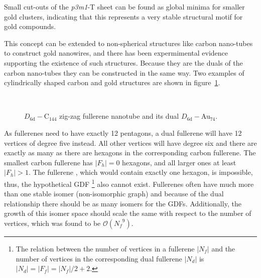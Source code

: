 Small cut-outs of the \textit{p3m1}-T sheet can be found as global minima for smaller
gold clusters, indicating that this represents a very stable structural motif
for gold compounds.\autocite{Assadollahzadeh_systematicsearchminimum_2009}

This concept can be extended to non-spherical structures like carbon nano-tubes
to construct gold nanowires, and there has been expermimental evidence
supporting the existence of such structures\autocite{Kondo-2000}. Because they
are the duals of the carbon nano-tubes they can be constructed in the same
way.\autocite{Dresselhaus-1992} Two examples of cylindrically shaped carbon and gold structures are shown in figure~\ref{fig:nanotubedual}.

\begin{figure}[htb]
    \begin{center}
         \\
        \caption{\protect{} $D_\mathrm{6d}-$C$_{144}$ zig-zag
        fullerene nanotube and \protect{} its dual
        $D_\mathrm{6d}-$Au$_{74}$.}
    \label{fig:nanotubedual}
    \end{center}
\end{figure}

As fullerenes need to have exactly 12 pentagons, a dual fullerene will have 12
vertices of degree five instead. All other vertices will have degree six and
there are exactly as many as there are hexagons in the corresponding carbon
fullerene. The smallest carbon fullerene  has $|F_h|=0$ hexagons, and
all larger ones at least $|F_h|>1$. The fullerene , which would contain
exactly one hexagon, is
impossible,\autocite{Grunbaum_numberhexagonssimplicity_1963} thus, the
hypothetical \ac{GDF} \footnote{The relation between the
number of vertices in a fullerene $|N_f|$ and the number of vertices in the
corresponding dual fullerene $|N_d|$ is
$|N_d|=|F_f|=|N_f|/2+2$.\autocite{Schwerdtfeger_topologyfullerenes_2015}} also
cannot exist. Fullerenes often have much more than one stable isomer
(non-isomorphic graph)\autocite{Fowler-atlas-2006} and because of the dual
relationship there should be as many isomers for the \acp{GDF}.
Additionally, the growth of this isomer space should scale the same with respect
to the number of vertices, which was found to be
$\mathcal{O}\left({N_f}^9\right)$.\autocite{Thurston_Shapespolyhedratriangulations_1998}


